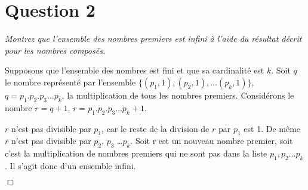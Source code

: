 \section*{Question 2}
\emph{Montrez que l’ensemble des nombres premiers est infini à l’aide du résultat décrit pour les nombres composés.}

\bigskip
Supposons que l’ensemble des nombres est fini et que sa cardinalité est $k$. Soit $q$ le nombre représenté par l’ensemble \( \{(p_1, 1), (p_2, 1), \dots (p_k, 1)\}\), \( q = p_1 . p_2 . p_3 \dots p_k\), la multiplication de tous les nombres premiers. Considérons le nombre \(r = q + 1\), \( r = p_1 . p_2 . p_3 \dots p_k + 1\).

\medskip

$r$ n’est pas divisible par $p_1$, car le reste de la division de $r$ par $p_1$ est 1. De même $r$ n’est pas divisible par $p_2$, $p_3$ \dots $p_k$. Soit r est un \og nouveau \fg{} nombre premier, soit c’est la multiplication de nombres premiers qui ne sont pas dans la liste $p_1, p_2 \dots p_k$. Il s’agit donc d’un ensemble infini.

\begin{flushright}
	$\Box$
\end{flushright} 